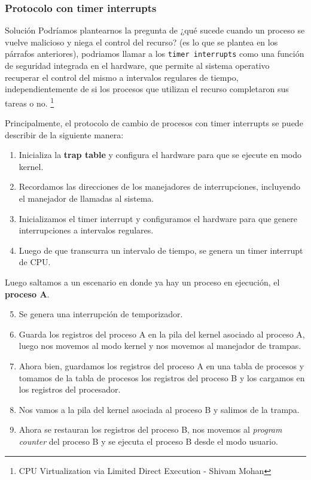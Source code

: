 \documentclass{article}
\begin{document}
\subsubsection{Protocolo con timer interrupts}
\begin{summary}{Solución}
Podríamos plantearnos la pregunta de ¿qué sucede cuando un proceso se vuelve malicioso y niega el control del recurso? (es lo que se plantea en los párrafos anteriores), podriamos llamar a los \texttt{timer interrupts} como una función de seguridad integrada en el hardware, que permite al sistema operativo recuperar el control del mismo a intervalos regulares de tiempo, independientemente de si los procesos que utilizan el recurso completaron sus tareas o no. \footnote{CPU Virtualization via Limited Direct Execution - Shivam Mohan}
\end{summary}
Principalmente, el protocolo de cambio de procesos con timer interrupts se puede describir de la siguiente manera:
\begin{enumerate}
    \item Inicializa la \textbf{trap table} y configura el hardware para que se ejecute en modo kernel.
    \item Recordamos las direcciones de los manejadores de interrupciones, incluyendo el manejador de llamadas al sistema.
    \item Inicializamos el timer interrupt y configuramos el hardware para que genere interrupciones a intervalos regulares.
    \item Luego de que transcurra un intervalo de tiempo, se genera un timer interrupt de CPU.
\end{enumerate}

Luego saltamos a un escenario en donde ya hay un proceso en ejecución, el \textbf{proceso A}.

\begin{enumerate}
    \setcounter{enumi}{4}
    \item Se genera una interrupción de temporizador.
    \item Guarda los registros del proceso A en la pila del kernel asociado al proceso A, luego nos movemos al modo kernel y nos movemos al manejador de trampas.
    \item Ahora bien, guardamos los registros del proceso A en una tabla de procesos y tomamos de la tabla de procesos los registros del proceso B y los cargamos en los registros del procesador.
    \item Nos vamos a la pila del kernel asociada al proceso B y salimos de la trampa.
    \item Ahora se restauran los registros del proceso B, nos movemos al \textit{program counter} del proceso B y se ejecuta el proceso B desde el modo usuario.
\end{enumerate}
\end{document}
